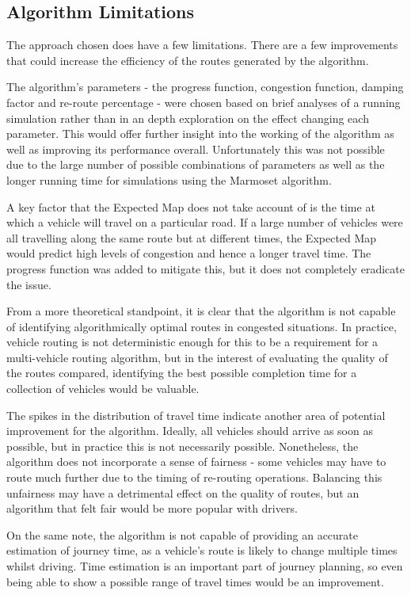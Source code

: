 \documentclass[ %
                    author={Alexander Hill},
                supervisor={Dr. Benjamin Sach},
                    degree={MEng},
                     title={MARMOSET},
                  subtitle={Multi-Agent Route Management using Online Simulation for Efficient Transportation},
                      type={research},
                      year={2016} ]{dissertation}
\begin{document}
\subsection{Algorithm Limitations}

The approach chosen does have a few limitations. There are a few improvements
that could increase the efficiency of the routes generated by the algorithm.

The algorithm's parameters - the progress function, congestion function, damping
factor and re-route percentage - were chosen based on brief analyses of a
running simulation rather than in an depth exploration on the effect changing
each parameter. This would offer further insight into the working of the
algorithm as well as improving its performance overall. Unfortunately this was
not possible due to the large number of possible combinations of parameters as
well as the longer running time for simulations using the Marmoset algorithm.

A key factor that the Expected Map does not take account of is the time at which
a vehicle will travel on a particular road. If a large number of vehicles were
all travelling along the same route but at different times, the Expected Map
would predict high levels of congestion and hence a longer travel time. The
progress function was added to mitigate this, but it does not completely
eradicate the issue.

From a more theoretical standpoint, it is clear that the algorithm is not
capable of identifying algorithmically optimal routes in congested situations.
In practice, vehicle routing is not deterministic enough for this to be a
requirement for a multi-vehicle routing algorithm, but in the interest of
evaluating the quality of the routes compared, identifying the best possible
completion time for a collection of vehicles would be valuable.

The spikes in the distribution of travel time indicate another area of potential
improvement for the algorithm. Ideally, all vehicles should arrive as soon as
possible, but in practice this is not necessarily possible. Nonetheless, the
algorithm does not incorporate a sense of fairness - some vehicles may have to
route much further due to the timing of re-routing operations. Balancing this
unfairness may have a detrimental effect on the quality of routes, but an
algorithm that felt fair would be more popular with drivers.

On the same note, the algorithm is not capable of providing an accurate
estimation of journey time, as a vehicle's route is likely to change multiple
times whilst driving. Time estimation is an important part of journey planning,
so even being able to show a possible range of travel times would be an
improvement.
\end{document}
